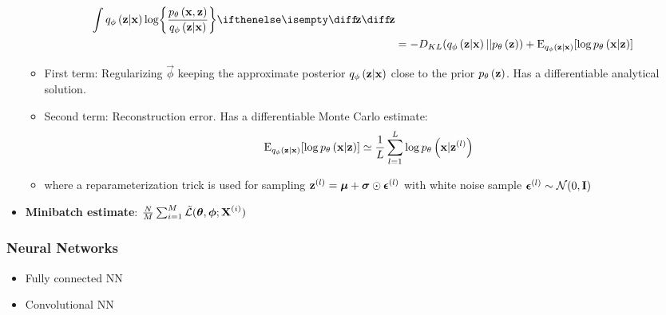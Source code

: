 \begin{itemize}
\begin{itemize}
\begin{gather}
\begin{split}
					\int \enc{\vec{z}|\vec{x}} \log \curlies*{ \frac{\dec{\vec{x},\vec{z}}}{\enc{\vec{z}|\vec{x}} } } \D{\vec{z}} \\
					& = -D_{KL}\parens{ \enc{\vec{z}|\vec{x}}||\dec{\vec{z}} } + \E_{\enc{\vec{z}|\vec{x}}} \brackets{\log \dec{\vec{x}|\vec{z}} }
				\end{split}
			\end{gather}
		\item First term: Regularizing $\vec{\phi}$ keeping the approximate posterior $q_{\phi}\left(\bm{\mathrm{z}}|\bm{\mathrm{x}}\right)$ close to the prior $p_{\theta}\left(\bm{\mathrm{z}}\right)$. Has a differentiable analytical solution.
		\item Second term: Reconstruction error. Has a differentiable Monte Carlo estimate:
		\begin{equation}
			\operatorname{E}_{q_{\phi}\left(\bm{\mathrm{z}}|\bm{\mathrm{x}}\right)} [\log p_{\theta}\left(\bm{\mathrm{x}}|\bm{\mathrm{z}}\right) ] \simeq \frac{1}{L}\sum^L_{l=1} \log p_{\theta}\left(\bm{\mathrm{x}}|\bm{\mathrm{z}}^{(l)}\right)
		\end{equation}
		\item where a reparameterization trick is used for sampling $\bm{\mathrm{z}}^{(l)}= \bm{\mathrm{\mu}} + \bm{\mathrm{\sigma}} \odot \bm{\mathrm{\epsilon}}^{(l)}$ with white noise sample $\bm{\mathrm{\epsilon}}^{(l)} \sim \mathcal{N}(0,\bm{\mathrm{I}})$
	\end{itemize}
	\item \textbf{Minibatch estimate}: $\frac{N}{M}\sum^{M}_{i=1}\tilde{\mathcal{L}}(\bm{\mathrm{\theta}},\bm{\mathrm{\phi}};\bm{\mathrm{X}}^{(i)})$
\end{itemize}

\subsubsection{Neural Networks} %
\label{subsub:neural_networks}
\begin{itemize}
	\item Fully connected NN
	\item Convolutional NN 
\end{itemize}






